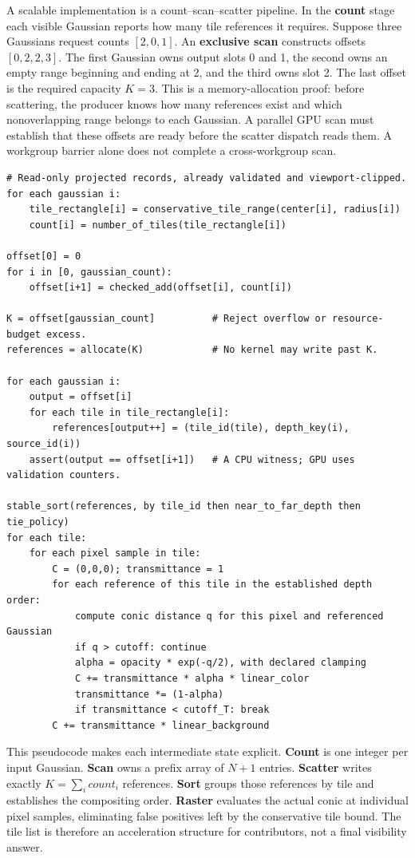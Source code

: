 A scalable implementation is a count--scan--scatter pipeline. In the \textbf{count} stage each visible Gaussian reports how many tile references it requires. Suppose three Gaussians request counts \([2,0,1]\). An \textbf{exclusive scan} constructs offsets \([0,2,2,3]\). The first Gaussian owns output slots 0 and 1, the second owns an empty range beginning and ending at 2, and the third owns slot 2. The last offset is the required capacity \(K=3\). This is a memory-allocation proof: before scattering, the producer knows how many references exist and which nonoverlapping range belongs to each Gaussian. A parallel GPU scan must establish that these offsets are ready before the scatter dispatch reads them. A workgroup barrier alone does not complete a cross-workgroup scan.

\begin{verbatim}
# Read-only projected records, already validated and viewport-clipped.
for each gaussian i:
    tile_rectangle[i] = conservative_tile_range(center[i], radius[i])
    count[i] = number_of_tiles(tile_rectangle[i])

offset[0] = 0
for i in [0, gaussian_count):
    offset[i+1] = checked_add(offset[i], count[i])

K = offset[gaussian_count]          # Reject overflow or resource-budget excess.
references = allocate(K)            # No kernel may write past K.

for each gaussian i:
    output = offset[i]
    for each tile in tile_rectangle[i]:
        references[output++] = (tile_id(tile), depth_key(i), source_id(i))
    assert(output == offset[i+1])   # A CPU witness; GPU uses validation counters.

stable_sort(references, by tile_id then near_to_far_depth then tie_policy)
for each tile:
    for each pixel sample in tile:
        C = (0,0,0); transmittance = 1
        for each reference of this tile in the established depth order:
            compute conic distance q for this pixel and referenced Gaussian
            if q > cutoff: continue
            alpha = opacity * exp(-q/2), with declared clamping
            C += transmittance * alpha * linear_color
            transmittance *= (1-alpha)
            if transmittance < cutoff_T: break
        C += transmittance * linear_background
\end{verbatim}

This pseudocode makes each intermediate state explicit. \textbf{Count} is one integer per input Gaussian. \textbf{Scan} owns a prefix array of \(N+1\) entries. \textbf{Scatter} writes exactly \(K=\sum_i count_i\) references. \textbf{Sort} groups those references by tile and establishes the compositing order. \textbf{Raster} evaluates the actual conic at individual pixel samples, eliminating false positives left by the conservative tile bound. The tile list is therefore an acceleration structure for contributors, not a final visibility answer.


